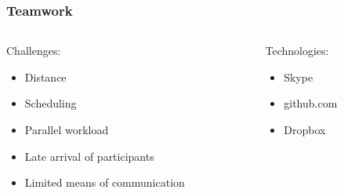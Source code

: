 	\begin{frame}
		\frametitle{Teamwork}
		\begin{columns}[t]
			\begin{column}[t]{0.5\linewidth}
				Challenges:
				\begin{itemize}
					\item Distance
					\item Scheduling
					\item Parallel workload
					\item Late arrival of participants
					\item Limited means of communication
				\end{itemize}
			\end{column}
			\begin{column}[t]{0.5\linewidth}
				Technologies:
				\begin{itemize}
					\item Skype
					\item github.com
					\item Dropbox
				\end{itemize}
			\end{column}		
		\end{columns}
	\end{frame}